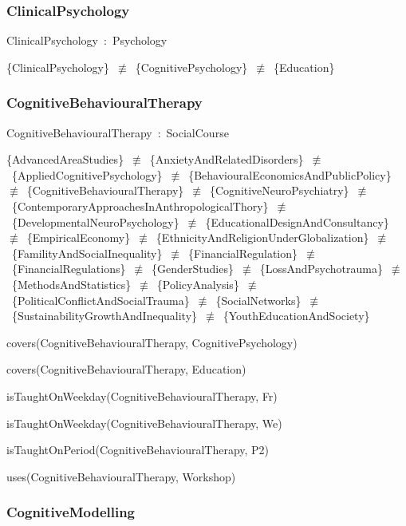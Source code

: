 \documentclass{article}
\begin{document}
\subsubsection*{ClinicalPsychology}

ClinicalPsychology~:~Psychology

\{ClinicalPsychology\}~\ensuremath{\not\equiv}~\{CognitivePsychology\}~\ensuremath{\not\equiv}~\{Education\}

\subsubsection*{CognitiveBehaviouralTherapy}

CognitiveBehaviouralTherapy~:~SocialCourse

\{AdvancedAreaStudies\}~\ensuremath{\not\equiv}~\{AnxietyAndRelatedDisorders\}~\ensuremath{\not\equiv}~\{AppliedCognitivePsychology\}~\ensuremath{\not\equiv}~\{BehaviouralEconomicsAndPublicPolicy\}~\ensuremath{\not\equiv}~\{CognitiveBehaviouralTherapy\}~\ensuremath{\not\equiv}~\{CognitiveNeuroPsychiatry\}~\ensuremath{\not\equiv}~\{ContemporaryApproachesInAnthropologicalThory\}~\ensuremath{\not\equiv}~\{DevelopmentalNeuroPsychology\}~\ensuremath{\not\equiv}~\{EducationalDesignAndConsultancy\}~\ensuremath{\not\equiv}~\{EmpiricalEconomy\}~\ensuremath{\not\equiv}~\{EthnicityAndReligionUnderGlobalization\}~\ensuremath{\not\equiv}~\{FamilityAndSocialInequality\}~\ensuremath{\not\equiv}~\{FinancialRegulation\}~\ensuremath{\not\equiv}~\{FinancialRegulations\}~\ensuremath{\not\equiv}~\{GenderStudies\}~\ensuremath{\not\equiv}~\{LossAndPsychotrauma\}~\ensuremath{\not\equiv}~\{MethodsAndStatistics\}~\ensuremath{\not\equiv}~\{PolicyAnalysis\}~\ensuremath{\not\equiv}~\{PoliticalConflictAndSocialTrauma\}~\ensuremath{\not\equiv}~\{SocialNetworks\}~\ensuremath{\not\equiv}~\{SustainabilityGrowthAndInequality\}~\ensuremath{\not\equiv}~\{YouthEducationAndSociety\}

covers(CognitiveBehaviouralTherapy, CognitivePsychology)

covers(CognitiveBehaviouralTherapy, Education)

isTaughtOnWeekday(CognitiveBehaviouralTherapy, Fr)

isTaughtOnWeekday(CognitiveBehaviouralTherapy, We)

isTaughtOnPeriod(CognitiveBehaviouralTherapy, P2)

uses(CognitiveBehaviouralTherapy, Workshop)

\subsubsection*{CognitiveModelling}
\end{document}
